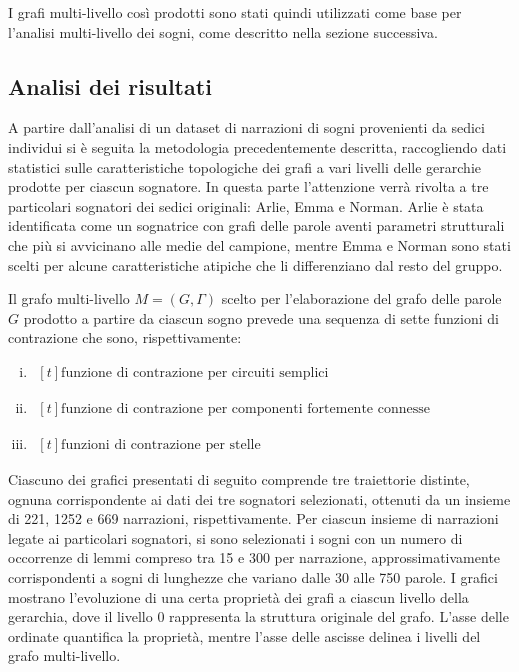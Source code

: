 I grafi multi-livello così prodotti sono stati quindi utilizzati come base per l'analisi multi-livello dei sogni,
come descritto nella sezione successiva.

\subsection{Analisi dei risultati}
A partire dall'analisi di un dataset di narrazioni di sogni provenienti da sedici individui si è seguita la
metodologia precedentemente descritta, raccogliendo dati statistici sulle caratteristiche topologiche
dei grafi a vari livelli delle gerarchie prodotte per ciascun sognatore.
In questa parte l'attenzione verrà rivolta a tre particolari sognatori dei sedici originali: Arlie, Emma e Norman.
Arlie è stata identificata come un sognatrice con grafi delle parole aventi parametri strutturali che più si
avvicinano alle medie del campione, mentre Emma e Norman sono stati scelti per alcune caratteristiche atipiche
che li differenziano dal resto del gruppo.

Il grafo multi-livello $M = (G, \Gamma)$ scelto per l'elaborazione del grafo delle parole $G$ prodotto a partire
da ciascun sogno prevede una sequenza di sette funzioni di contrazione che sono, rispettivamente:
\begin{enumerate}[(i)]
    \item {}
    $ \begin{aligned}[t]
      \text{funzione di contrazione per circuiti semplici}
      \end{aligned} $
    \item {}
    $ \begin{aligned}[t]
      \text{funzione di contrazione per componenti fortemente connesse}
      \end{aligned} $
    \item {}
    $ \begin{aligned}[t]
      \text{funzioni di contrazione per stelle}
      \end{aligned} $
\end{enumerate}

Ciascuno dei grafici presentati di seguito comprende tre traiettorie distinte, ognuna corrispondente ai dati
dei tre sognatori selezionati, ottenuti da un insieme di 221, 1252 e 669 narrazioni, rispettivamente.
Per ciascun insieme di narrazioni legate ai particolari sognatori, si sono selezionati i sogni con un numero di
occorrenze di lemmi compreso tra 15 e 300 per narrazione, approssimativamente corrispondenti a sogni
di lunghezze che variano dalle 30 alle 750 parole.
I grafici mostrano l'evoluzione di una certa proprietà dei grafi a ciascun livello della gerarchia,
dove il livello 0 rappresenta la struttura originale del grafo.
L'asse delle ordinate quantifica la proprietà, mentre l'asse delle ascisse delinea i livelli del grafo multi-livello.


